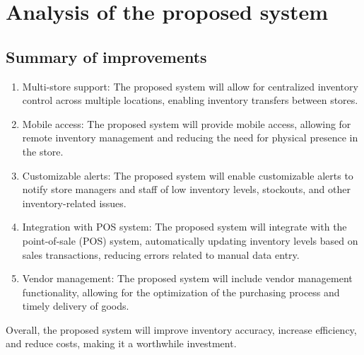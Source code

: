 \chapter{Analysis of the proposed system \\ 
\label{Chapter::Analysisoftheproposedsystem}}
\section{Summary of improvements \label{Section::Summaryofimprovements}}
\begin{enumerate}
    \item Multi-store support: The proposed system will allow for centralized inventory control across multiple locations, enabling inventory transfers between stores.

    \item Mobile access: The proposed system will provide mobile access, allowing for remote inventory management and reducing the need for physical presence in the store.

    \item Customizable alerts: The proposed system will enable customizable alerts to notify store managers and staff of low inventory levels, stockouts, and other inventory-related issues.

    \item Integration with POS system: The proposed system will integrate with the point-of-sale (POS) system, automatically updating inventory levels based on sales transactions, reducing errors related to manual data entry.

    \item Vendor management: The proposed system will include vendor management functionality, allowing for the optimization of the purchasing process and timely delivery of goods.
\end{enumerate}
\noindent
Overall, the proposed system will improve inventory accuracy, increase efficiency, and reduce costs, making it a worthwhile investment.

